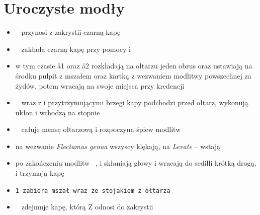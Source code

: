 \section{Uroczyste modły}

\begin{itemize}
      \item \zz~ przynosi z zakrystii czarną kapę
      \item \ii~ zakłada czarną kapę przy pomocy  i 
      \item  w tym czasie \aa1 oraz \aa2 rozkładają na ołtarzu jeden obrus oraz
            ustawiają na środku pulpit z mszałem oraz kartką z wezwaniem
            modlitwy powszechnej za żydów, potem wracają na swoje miejsca przy
            kredencji
      \item  \ii~ wraz z  i  przytrzymującymi brzegi kapy podchodzi
            przed ołtarz, wykonują ukłon i wchodzą na stopnie
      \item  \ii~ całuje mensę ołtarzową i rozpoczyna śpiew modlitw
      \item  na wezwanie \textit{Flectamus genua} wszyscy klękają, na
            \textit{Levate} – wstają
      \item  po zakończeniu modlitw \ii~,  i  skłaniają głowy i wracają
            do sedilli krótką drogą,  i  trzymają kapę
      \item \tt1 zabiera mszał wraz ze stojakiem z ołtarza
      \item  \ii~ zdejmuje kapę, którą Z odnosi do zakrystii
\end{itemize}